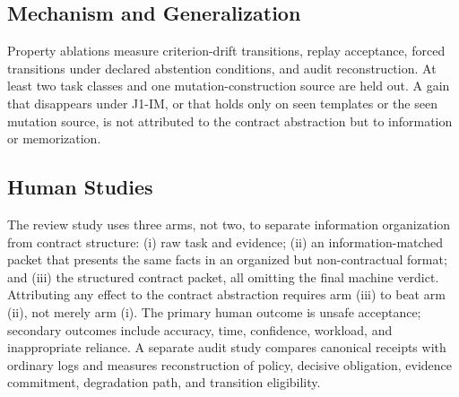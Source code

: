 \documentclass[sigconf,anonymous,review]{acmart}
\begin{document}
\subsection{Mechanism and Generalization}
Property ablations measure criterion-drift transitions, replay acceptance, forced transitions under declared abstention conditions, and audit reconstruction. At least two task classes and one mutation-construction source are held out. A gain that disappears under J1-IM, or that holds only on seen templates or the seen mutation source, is not attributed to the contract abstraction but to information or memorization.

\subsection{Human Studies}
The review study uses three arms, not two, to separate information organization from contract structure: (i) raw task and evidence; (ii) an information-matched packet that presents the same facts in an organized but non-contractual format; and (iii) the structured contract packet, all omitting the final machine verdict. Attributing any effect to the contract abstraction requires arm (iii) to beat arm (ii), not merely arm (i). The primary human outcome is unsafe acceptance; secondary outcomes include accuracy, time, confidence, workload, and inappropriate reliance. A separate audit study compares canonical receipts with ordinary logs and measures reconstruction of policy, decisive obligation, evidence commitment, degradation path, and transition eligibility.
\end{document}
